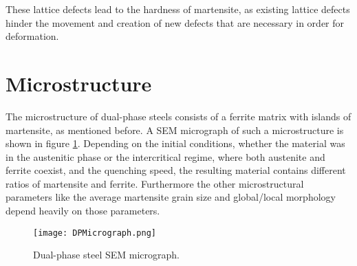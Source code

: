 These lattice defects lead to the hardness of martensite, as existing lattice defects hinder the movement and creation of new defects that are necessary in order for deformation.



\section{Microstructure}

The microstructure of dual-phase steels consists of a ferrite matrix with islands of martensite, as mentioned before. A SEM micrograph of such a microstructure is shown in figure \ref{fig:DPMicrostructure}. Depending on the initial conditions, whether the material was in the austenitic phase or the intercritical regime, where both austenite and ferrite coexist, and the quenching speed, the resulting material contains different ratios of martensite and ferrite. Furthermore the other microstructural parameters like the average martensite grain size and global/local morphology depend heavily on those parameters.  

\begin{figure}[H]
\centering
  \texttt{[image: DPMicrograph.png]}
  \caption{Dual-phase steel SEM micrograph.}
  \label{fig:DPMicrostructure}
\end{figure}

%
%



